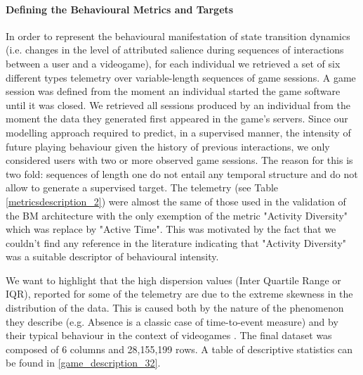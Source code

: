 \paragraph*{Defining the Behavioural Metrics and Targets}
In order to represent the behavioural manifestation of state transition dynamics (i.e. changes in the level of attributed salience during sequences of interactions between a user and a videogame), for each individual we retrieved a set of six different types telemetry over variable-length sequences of game sessions. A game session was defined from the moment an individual started the game software until it was closed. We retrieved all sessions produced by an individual from the moment the data they generated first appeared in the game's servers. Since our modelling approach required to predict, in a supervised manner, the intensity of future playing behaviour given the history of previous interactions, we only considered users with two or more observed game sessions. The reason for this is two fold: sequences of length one do not entail any temporal structure and do not allow to generate a supervised target. The telemetry (see Table \ref{metricsdescription_2}) were almost the same of those used in the validation of the BM architecture with the only exemption of the metric "Activity Diversity" which was replace by "Active Time". This was motivated by the fact that we couldn't find any reference in the literature indicating that "Activity Diversity" was a suitable descriptor of behavioural intensity. 

We want to highlight that the high dispersion values (Inter Quartile Range  or IQR), reported for some of the telemetry are due to the extreme skewness in the distribution of the data. This is caused both by the nature of the phenomenon they describe (e.g. Absence is a classic case of time-to-event measure) and by their typical behaviour in the context of videogames \cite{bauckhage2012players}. The final dataset was composed of 6 columns and 28,155,199 rows. A table of descriptive statistics can be found in \ref{game_description_32}.


